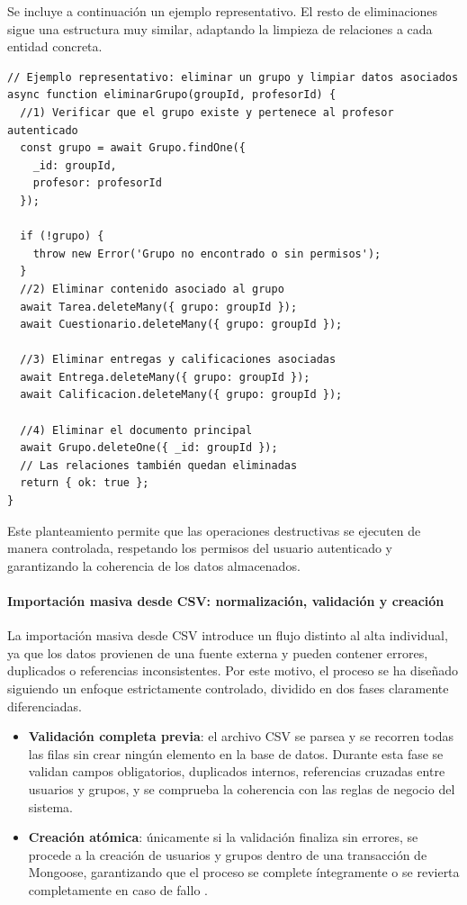 Se incluye a continuación un ejemplo representativo. El resto de eliminaciones sigue una estructura muy similar, adaptando la limpieza de relaciones a cada entidad concreta.

\begin{Verbatim}[frame=single, fontsize=\small, xleftmargin=10pt, xrightmargin=10pt]
// Ejemplo representativo: eliminar un grupo y limpiar datos asociados
async function eliminarGrupo(groupId, profesorId) {
  //1) Verificar que el grupo existe y pertenece al profesor autenticado
  const grupo = await Grupo.findOne({
    _id: groupId,
    profesor: profesorId
  });

  if (!grupo) {
    throw new Error('Grupo no encontrado o sin permisos');
  }
  //2) Eliminar contenido asociado al grupo
  await Tarea.deleteMany({ grupo: groupId });
  await Cuestionario.deleteMany({ grupo: groupId });

  //3) Eliminar entregas y calificaciones asociadas
  await Entrega.deleteMany({ grupo: groupId });
  await Calificacion.deleteMany({ grupo: groupId });

  //4) Eliminar el documento principal
  await Grupo.deleteOne({ _id: groupId });
  // Las relaciones también quedan eliminadas
  return { ok: true };
}
\end{Verbatim}

Este planteamiento permite que las operaciones destructivas se ejecuten de manera controlada, respetando los permisos del usuario autenticado y garantizando la coherencia de los datos almacenados.

\paragraph{Importación masiva desde CSV: normalización, validación y creación}

La importación masiva desde CSV \cite{RFC4180CSVValidation} introduce un flujo distinto al alta individual, ya que los datos provienen de una fuente externa y pueden contener errores, duplicados o referencias inconsistentes. Por este motivo, el proceso se ha diseñado siguiendo un enfoque estrictamente controlado, dividido en dos fases claramente diferenciadas.

\begin{itemize}
  \item \textbf{Validación completa previa}: el archivo CSV se parsea y se recorren todas las filas sin crear ningún elemento en la base de datos. Durante esta fase se validan campos obligatorios, duplicados internos, referencias cruzadas entre usuarios y grupos, y se comprueba la coherencia con las reglas de negocio del sistema.
  \item \textbf{Creación atómica}: únicamente si la validación finaliza sin errores, se procede a la creación de usuarios y grupos dentro de una transacción de Mongoose, garantizando que el proceso se complete íntegramente o se revierta completamente en caso de fallo \cite{MongooseTransactions}.
\end{itemize}

